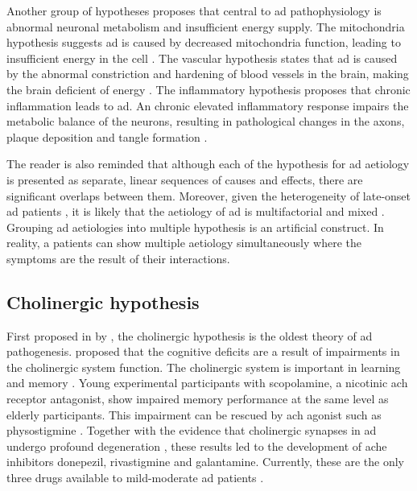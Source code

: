 Another group of hypotheses proposes that central to \gls{ad} pathophysiology is abnormal neuronal metabolism and insufficient energy supply. The mitochondria hypothesis suggests \gls{ad} is caused by decreased mitochondria function, leading to insufficient energy in the cell \citep{zhu06a, swerdlow14}. The vascular hypothesis states that \gls{ad} is caused by the abnormal constriction and hardening of blood vessels in the brain, making the brain deficient of energy \citep{luchsinger05, mamelak17}. The inflammatory hypothesis proposes that chronic inflammation leads to \gls{ad}. An chronic elevated inflammatory response impairs the metabolic balance of the neurons, resulting in pathological changes in the axons, plaque deposition and tangle formation \citep{krstic13}. 

The reader is also reminded that although each of the hypothesis for \gls{ad} aetiology is presented as separate, linear sequences of causes and effects, there are significant overlaps between them. Moreover, given the heterogeneity of late-onset \gls{ad} patients \citep{komarova11, tschanz11}, it is likely that the aetiology of \gls{ad} is multifactorial and mixed \citep{schneider07}. Grouping \gls{ad} aetiologies into multiple hypothesis is an artificial construct. In reality, a patients can show multiple aetiology simultaneously where the symptoms are the result of their interactions. 

\subsection{Cholinergic hypothesis\label{ach-hypo}}

First proposed in \citeyear{bartus82} by \citeauthor{bartus82}, the cholinergic hypothesis is the oldest theory of \gls{ad} pathogenesis. \citet{bartus82} proposed that the cognitive deficits are a result of impairments in the cholinergic system function. The cholinergic system is important in learning and memory \citep{deutsch71}. Young experimental participants with scopolamine, a nicotinic \gls{ach} receptor antagonist, show impaired memory performance at the same level as elderly participants. This impairment can be rescued by \gls{ach} agonist such as physostigmine \citep{drachman74}. Together with the evidence that cholinergic synapses in \gls{ad} undergo profound degeneration \citep{whitehouse82}, these results led to the development of \gls{ache} inhibitors donepezil, rivastigmine and galantamine. Currently, these are the only three drugs available to mild-moderate \gls{ad} patients \citep[][ also see Section \ref{treatment}]{bartus00}. 

